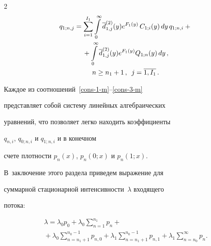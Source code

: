 \begin{multicols}{2}
\begin{multline}


\label{cons-3-m}


q_{1;n,j} = \sum\limits_{i=1}^{I_1} \int\limits_0^\infty \d^{(2)}_{1,j}(y) 


e^{F_{1}(y)}\, C_{1;i}(y)\, dy\, q_{1;n,i}


+{}\\


{}+


\int\limits_0^\infty \d^{(2)}_{1,j}(y) e^{F_{1}(y)} Q_{1;n}(y)\, dy\,,\\ 


n\ge n_1+1\,, \enskip j=\overline{1,I_1}\,.


\end{multline}







Каждое из соотношений~\eqref{cons-1-m}--\eqref{cons-3-m}


представляет собой систему линейных алгебраических


уравнений, что позволяет легко находить коэффициенты


$q_{n,i}$, $q_{0;n,i}$ и $q_{1;n,i}$ и в конечном


счете плотности $p_n(x)$, $p_n(0;x)$ и $p_n(1;x)$.








В~заключение этого раздела приведем выражение для


суммарной стационарной интенсивности~$\lambda$ входящего


потока:


\begin{multline}


\label{inten-1-m}


\lambda = \lambda_0 p_0 + \lambda_0 \sum\limits_{n=1}^{n_1}


p_n +{}\\


\!\!{}+ \lambda_0 \sum\limits_{n=n_1+1}^{n_0-1} p_{n,0}


+ \lambda_1 \sum\limits_{n=n_1+1}^{n_0-1} p_{n,1}


+ \lambda_1 \sum\limits_{n=n_0}^{\infty} p_n .\!\!


\end{multline}






\end{multicols}
